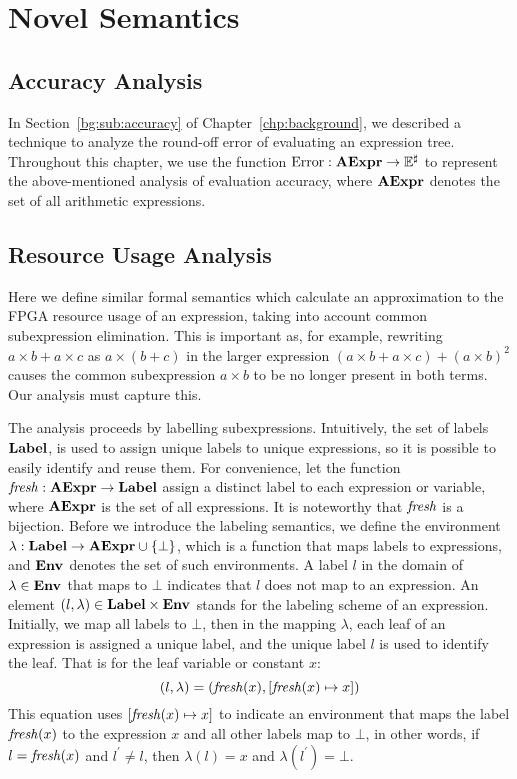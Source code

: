 \section{Novel Semantics}
\label{so:sec:semantics}

\subsection{Accuracy Analysis}

In Section~\ref{bg:sub:accuracy} of Chapter~\ref{chp:background}, we described
a technique to analyze the round-off error of evaluating an expression tree.
Throughout this chapter, we use the function $\operatorname{\mathrm{Error}}: \mathbf{AExpr}\to\mathbb{E}^\sharp$ to
represent the above-mentioned analysis of evaluation accuracy, where $\mathbf{AExpr}$
denotes the set of all arithmetic expressions.


\subsection{Resource Usage Analysis}

Here we define similar formal semantics which calculate an approximation to the
FPGA resource usage of an expression, taking into account common subexpression
elimination. This is important as, for example, rewriting $a \times b + a
\times c$ as $a \times (b + c)$ in the larger expression $(a \times b + a
\times c) + {(a \times b)}^2$ causes the common subexpression $a \times b$ to
be no longer present in both terms. Our analysis must capture this.

The analysis proceeds by labelling subexpressions. Intuitively, the
set of labels $\mathbf{Label}$, is used to assign unique labels to unique
expressions, so it is possible to easily identify and reuse them. For
convenience, let the function $\operatorname{\mathit{fresh}}: \mathbf{AExpr}\to\mathbf{Label}$ assign a
distinct label to each expression or variable, where $\mathbf{AExpr}$ is the set
of all expressions.  It is noteworthy that $\operatorname{\mathit{fresh}}$ is a bijection. Before
we introduce the labeling semantics, we define the environment $\lambda:
\mathbf{Label}\to\mathbf{AExpr}\cup\{\bot\}$, which is a function that maps labels to
expressions, and $\mathbf{Env}_{}$ denotes the set of such environments. A label $l$ in
the domain of $\lambda\in\mathbf{Env}_{}$ that maps to $\bot$ indicates that $l$ does
not map to an expression. An element $(l, \lambda)\in\mathbf{Label}\times\mathbf{Env}_{}$
stands for the labeling scheme of an expression. Initially, we map all labels
to $\bot$, then in the mapping $\lambda$, each leaf of an expression is
assigned a unique label, and the unique label $l$ is used to identify the leaf.
That is for the leaf variable or constant $x$:
\begin{equation}
    (l, \lambda) = (\operatorname{\mathit{fresh}}(x), [\operatorname{\mathit{fresh}}(x)\mapsto{x}])
\end{equation}
This equation uses $[\operatorname{\mathit{fresh}}(x)\mapsto{x}]$ to indicate an environment that
maps the label $\operatorname{\mathit{fresh}}(x)$ to the expression $x$ and all other labels map
to $\bot$, in other words, if $l = \operatorname{\mathit{fresh}}(x)$ and $l^\prime \neq l$, then
$\lambda(l) = x$ and $\lambda(l^\prime) = \bot$.

